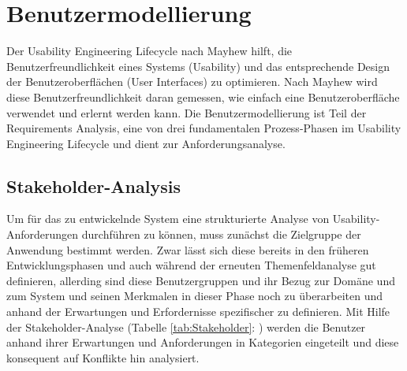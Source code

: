\section{Benutzermodellierung}
	Der Usability Engineering Lifecycle nach Mayhew hilft, die Benutzerfreundlichkeit eines Systems (Usability) und das entsprechende Design der Benutzeroberflächen (User Interfaces) zu optimieren. Nach Mayhew wird diese Benutzerfreundlichkeit daran gemessen, wie einfach eine Benutzeroberfläche verwendet und erlernt werden kann. Die Benutzermodellierung ist Teil der \glqq Requirements Analysis\grqq{}, eine von drei fundamentalen Prozess-Phasen im Usability Engineering Lifecycle und dient zur Anforderungsanalyse. \cite{MD}
	\subsection{Stakeholder-Analysis}
	Um für das zu entwickelnde System eine strukturierte Analyse von Usability-Anforderungen durchführen zu können, muss zunächst die Zielgruppe der Anwendung bestimmt werden. Zwar lässt sich diese bereits in den früheren Entwicklungsphasen und auch während der erneuten Themenfeldanalyse gut definieren, allerding sind diese Benutzergruppen und ihr Bezug zur Domäne und zum System und seinen Merkmalen in dieser Phase noch zu überarbeiten und anhand der Erwartungen und Erfordernisse spezifischer zu definieren. Mit Hilfe der Stakeholder-Analyse (Tabelle \ref{tab:Stakeholder}: \glqq {}\grqq{}) werden die Benutzer anhand ihrer Erwartungen und Anforderungen in Kategorien eingeteilt und diese konsequent auf Konflikte hin analysiert.
